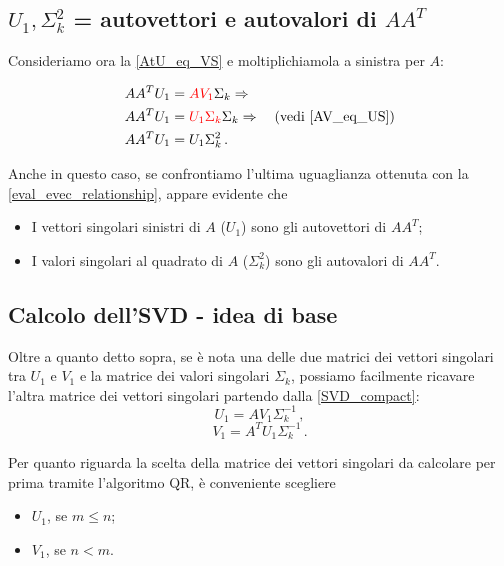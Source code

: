\subsection{$U_1, \Sigma_{k}^2$ = autovettori e autovalori di $A A^T$}
Consideriamo ora la \eqref{AtU_eq_VS} e moltiplichiamola a sinistra per $A$:
\begin{flushleft}
\vspace{-20pt}
\begin{align*}
	A A^T U_1 &= \textcolor{red}{A V_1} \Sigma_k \Rightarrow \\
	A A^T U_1 &= \textcolor{red}{U_1 \Sigma_k} \Sigma_k \Rightarrow \quad 
\text{(vedi \eqref{AV_eq_US}}) \\
	A A^T U_1 &= U_1 \Sigma_{k}^2 \,.
\end{align*}
\end{flushleft}

Anche in questo caso, se confrontiamo l'ultima uguaglianza ottenuta con la 
\eqref{eval_evec_relationship}, appare evidente che
\begin{itemize}
	\item I vettori singolari sinistri di $A$ ($U_1$) sono gli autovettori di $A 
A^T$;
	\item I valori singolari al quadrato di $A$ ($\Sigma_{k}^2$) sono gli 
autovalori di $A A^T$.
\end{itemize}

\subsection{Calcolo dell'SVD - idea di base}
\label{subsec:SVD_calc}
Oltre a quanto detto sopra, se è nota una delle due matrici dei vettori 
singolari tra $U_1$ e $V_1$ e la matrice dei valori singolari $\Sigma_k$, 
possiamo facilmente ricavare l'altra matrice dei vettori singolari partendo 
dalla \eqref{SVD_compact}:
\begin{equation*}
	U_1 = A V_1 \Sigma_{k}^{-1} \,,
\end{equation*}
\begin{equation*}
	V_1 = A^T U_1 \Sigma_{k}^{-1} \,.
\end{equation*}

Per quanto riguarda la scelta della matrice dei vettori singolari da calcolare 
per prima tramite l'algoritmo QR, è conveniente scegliere
\begin{itemize}
	\item $U_1$, se $m \leq n$;
	\item $V_1$, se $n < m$.
\end{itemize}

